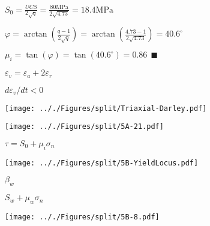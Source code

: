 \documentclass[onecolumn,11pt]{report}
\def\lthtmlcheckvsize{\ifdim\ht\sizebox<\vsize 
  \ifdim\wd\sizebox<\hsize\expandafter\hfill\fi \expandafter\vfill
  \else\expandafter\vss\fi}%
\begin{document}
{\newpage\clearpage
{}%
$\displaystyle S_0 = \frac{UCS}{2 \sqrt{q}} = \frac{80 \text{MPa}}{2 \sqrt{4.73}} = 18.4 \text{MPa} $%
\lthtmlindisplaymathZ
\lthtmlcheckvsize\clearpage}

{\newpage\clearpage
{}%
$\displaystyle \varphi = \arctan \left( \frac{q-1}{2\sqrt{q}} \right) 
        = \arctan \left( \frac{4.73-1}{2\sqrt{4.73}} \right) = 40.6^{\circ} 
$%
\lthtmlindisplaymathZ
\lthtmlcheckvsize\clearpage}

{\newpage\clearpage
{}%
$\displaystyle \mu_i = \tan (\varphi) = \tan (40.6^{\circ}) = 0.86 
\: \: \blacksquare
$%
\lthtmlindisplaymathZ
\lthtmlcheckvsize\clearpage}

{\newpage\clearpage
{}%
$ \varepsilon_v = \varepsilon_a + 2\varepsilon_r$%
\lthtmlindisplaymathZ
\lthtmlcheckvsize\clearpage}

{\newpage\clearpage
{}%
$ d \varepsilon_v/dt<0$%
\lthtmlindisplaymathZ
\lthtmlcheckvsize\clearpage}

{\newpage\clearpage
{}%
\texttt{[image: .././Figures/split/Triaxial-Darley.pdf]}%
\lthtmlpictureZ
\lthtmlcheckvsize\clearpage}

{\newpage\clearpage
{}%
\texttt{[image: .././Figures/split/5A-21.pdf]}%
\lthtmlpictureZ
\lthtmlcheckvsize\clearpage}

{\newpage\clearpage
{}%
$ \tau = S_0 + \mu_i \sigma_n$%
\lthtmlindisplaymathZ
\lthtmlcheckvsize\clearpage}

{\newpage\clearpage
{}%
\texttt{[image: .././Figures/split/5B-YieldLocus.pdf]}%
\lthtmlpictureZ
\lthtmlcheckvsize\clearpage}

{\newpage\clearpage
{}%
$ \beta_w$%
\lthtmlindisplaymathZ
\lthtmlcheckvsize\clearpage}

{\newpage\clearpage
{}%
$ S_w + \mu_w \sigma_n$%
\lthtmlindisplaymathZ
\lthtmlcheckvsize\clearpage}

{\newpage\clearpage
{}%
\texttt{[image: .././Figures/split/5B-8.pdf]}%
\lthtmlpictureZ
\lthtmlcheckvsize\clearpage}
\end{document}
